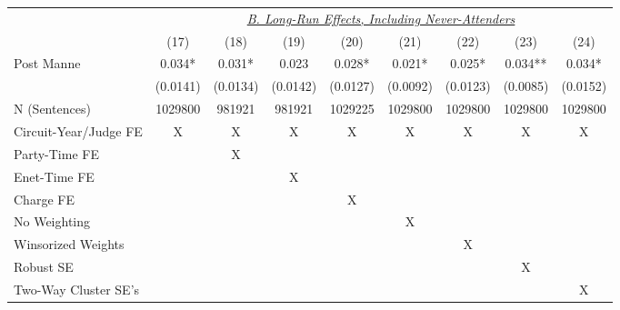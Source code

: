 \begin{center}
{\begin{tabular}{l*{8}{c}}
                    &\multicolumn{8}{c}{\uline{\textit{B. Long-Run Effects, Including Never-Attenders}}}                                    \\
                    &        (17)  &        (18)  &        (19)  &        (20)  &        (21)  &        (22)  &        (23)  &        (24)  \\
\cmidrule(lr){2-9}
Post Manne          &       0.034* &       0.031* &       0.023  &       0.028* &       0.021* &       0.025* &       0.034**&       0.034* \\
                    &    (0.0141)  &    (0.0134)  &    (0.0142)  &    (0.0127)  &    (0.0092)  &    (0.0123)  &    (0.0085)  &    (0.0152)  \\
\cmidrule(lr){1-9}
N (Sentences)       &     1029800  &      981921  &      981921  &     1029225  &     1029800  &     1029800  &     1029800  &     1029800  \\
Circuit-Year/Judge FE&           X  &           X  &           X  &           X  &           X  &           X  &           X  &           X  \\
Party-Time FE       &              &           X  &              &              &              &              &              &              \\
Enet-Time FE        &              &              &           X  &              &              &              &              &              \\
Charge FE           &              &              &              &           X  &              &              &              &              \\
No Weighting        &              &              &              &              &           X  &              &              &              \\
Winsorized Weights  &              &              &              &              &              &           X  &              &              \\
Robust SE           &              &              &              &              &              &              &           X  &              \\
Two-Way Cluster SE's&              &              &              &              &              &              &              &           X  \\
\bottomrule
\end{tabular}
}
\end{center}
